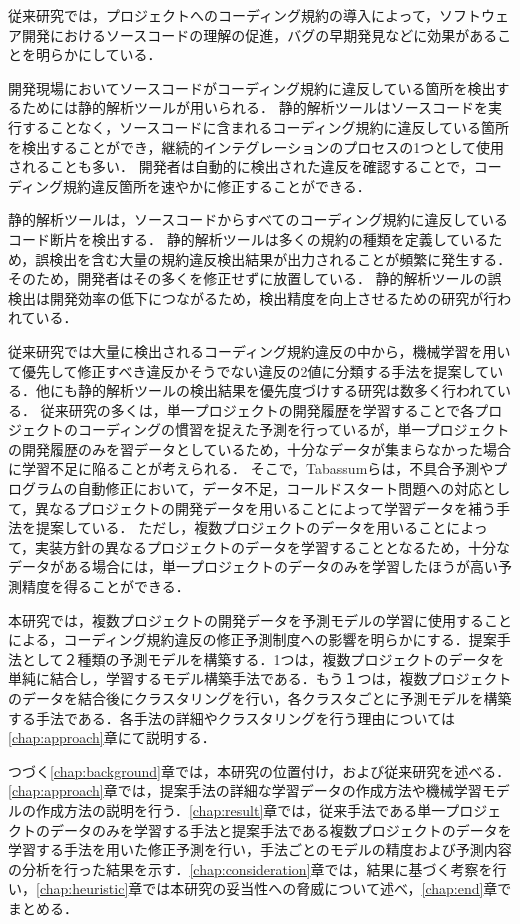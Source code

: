 \documentclass[11pt,dvipdfmx]{jreport}
\begin{document}
従来研究では，プロジェクトへのコーディング規約の導入によって，ソフトウェア開発におけるソースコードの理解の促進，バグの早期発見などに効果があることを明らかにしている\cite{Beller2}\cite{Johnson}\cite{Beller}．

開発現場においてソースコードがコーディング規約に違反している箇所を検出するためには静的解析ツールが用いられる．
静的解析ツールはソースコードを実行することなく，ソースコードに含まれるコーディング規約に違反している箇所を検出することができ，継続的インテグレーションのプロセスの1つとして使用されることも多い．
開発者は自動的に検出された違反を確認することで，コーディング規約違反箇所を速やかに修正することができる．

静的解析ツールは，ソースコードからすべてのコーディング規約に違反しているコード断片を検出する．
静的解析ツールは多くの規約の種類を定義しているため，誤検出を含む大量の規約違反検出結果が出力されることが頻繁に発生する．
そのため，開発者はその多くを修正せずに放置している．
静的解析ツールの誤検出は開発効率の低下につながるため，検出精度を向上させるための研究が行われている\cite{Nguyen}．

従来研究では大量に検出されるコーディング規約違反の中から，機械学習を用いて優先して修正すべき違反かそうでない違反の2値に分類する手法を提案している\cite{JyuraiPre}．他にも静的解析ツールの検出結果を優先度づけする研究は数多く行われている．
従来研究の多くは，単一プロジェクトの開発履歴を学習することで各プロジェクトのコーディングの慣習を捉えた予測を行っているが，単一プロジェクトの開発履歴のみを習データとしているため，十分なデータが集まらなかった場合に学習不足に陥ることが考えられる．
そこで，Tabassumらは，不具合予測やプログラムの自動修正において，データ不足，コールドスタート問題への対応として，異なるプロジェクトの開発データを用いることによって学習データを補う手法を提案している\cite{Tabassum}．
ただし，複数プロジェクトのデータを用いることによって，実装方針の異なるプロジェクトのデータを学習することとなるため，十分なデータがある場合には，単一プロジェクトのデータのみを学習したほうが高い予測精度を得ることができる．

本研究では，複数プロジェクトの開発データを予測モデルの学習に使用することによる，コーディング規約違反の修正予測制度への影響を明らかにする．提案手法として２種類の予測モデルを構築する．1つは，複数プロジェクトのデータを単純に結合し，学習するモデル構築手法である．もう１つは，複数プロジェクトのデータを結合後にクラスタリングを行い，各クラスタごとに予測モデルを構築する手法である．各手法の詳細やクラスタリングを行う理由については\ref{chap:approach}章にて説明する．

つづく\ref{chap:background}章では，本研究の位置付け，および従来研究を述べる．\ref{chap:approach}章では，提案手法の詳細な学習データの作成方法や機械学習モデルの作成方法の説明を行う．\ref{chap:result}章では，従来手法である単一プロジェクトのデータのみを学習する手法と提案手法である複数プロジェクトのデータを学習する手法を用いた修正予測を行い，手法ごとのモデルの精度および予測内容の分析を行った結果を示す．\ref{chap:consideration}章では，結果に基づく考察を行い，\ref{chap:heuristic}章では本研究の妥当性への脅威について述べ，\ref{chap:end}章でまとめる．
\end{document}
